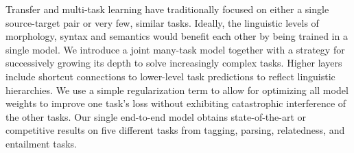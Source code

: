 Transfer and multi-task learning have traditionally focused on either a single source-target pair or very few, similar tasks. Ideally, the linguistic levels of morphology, syntax and semantics would benefit each other by being trained in a single model. We introduce a joint many-task model together with a strategy for successively growing its depth to solve increasingly complex tasks. Higher layers include shortcut connections to lower-level task predictions to reflect linguistic hierarchies. We use a simple regularization term to allow for optimizing all model weights to improve one task's loss without exhibiting catastrophic interference of the other tasks. Our single end-to-end model obtains state-of-the-art or competitive results on five different tasks from tagging, parsing, relatedness, and entailment tasks.
